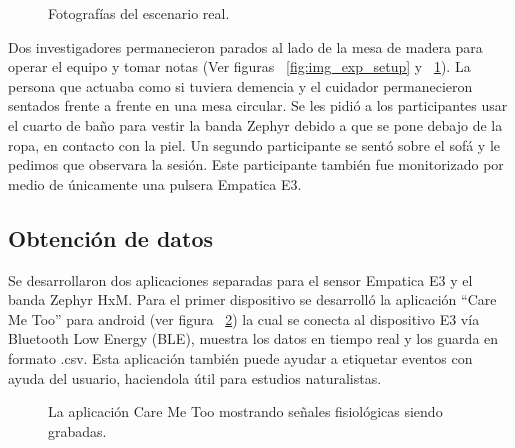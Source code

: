 \begin{figure}[h!]
        \centering
	\caption{Fotograf\'ias del escenario real.} \label{fig:img_exp_pics}
\end{figure}
Dos investigadores permanecieron parados al lado de la mesa de madera para operar el equipo y tomar notas (Ver figuras ~\ref{fig:img_exp_setup} y ~\ref{fig:img_exp_pics}). La persona que actuaba como si tuviera demencia y el cuidador permanecieron sentados frente a frente en una mesa circular. Se les pidi\'o a los participantes usar el cuarto de ba\~no para vestir la banda Zephyr debido a que se pone debajo de la ropa, en contacto con la piel. Un segundo participante se sent\'o sobre el sof\'a y le pedimos que observara la sesi\'on. Este participante tambi\'en fue monitorizado por medio de \'unicamente una pulsera Empatica E3.


\subsection{Obtenci\'on de datos}\label{secc:datagathering}
Se desarrollaron dos aplicaciones separadas para el sensor Empatica E3 y el banda Zephyr HxM. Para el primer dispositivo se desarroll\'o la aplicaci\'on ``Care Me Too'' para android (ver figura ~\ref{fig:caremetoo}) la cual se conecta al dispositivo E3 v\'ia Bluetooth Low Energy (BLE), muestra los datos en tiempo real y los guarda en formato .csv. Esta aplicaci\'on tambi\'en puede ayudar a etiquetar eventos con ayuda del usuario, haciendola \'util para estudios naturalistas.


\begin{figure}[h]
        \centering
        \caption{La aplicaci\'on Care Me Too mostrando se\~nales fisiol\'ogicas siendo grabadas.}\label{fig:caremetoo}
\end{figure}

